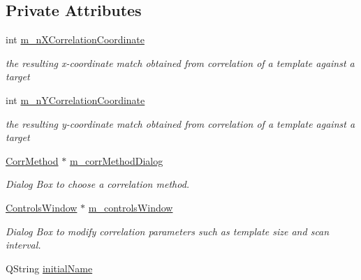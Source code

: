 \subsection*{Private Attributes}
\begin{DoxyCompactItemize}
\item 
\hypertarget{classQcorr_a53798525ce189307cf597e71aabca91b}{
int \hyperlink{classQcorr_a53798525ce189307cf597e71aabca91b}{m\_\-nXCorrelationCoordinate}}
\label{classQcorr_a53798525ce189307cf597e71aabca91b}

\begin{DoxyCompactList}\small\item\em the resulting x-\/coordinate match obtained from correlation of a template against a target \item\end{DoxyCompactList}\item 
\hypertarget{classQcorr_a29f34cc7b765d5a64856696c48bfc191}{
int \hyperlink{classQcorr_a29f34cc7b765d5a64856696c48bfc191}{m\_\-nYCorrelationCoordinate}}
\label{classQcorr_a29f34cc7b765d5a64856696c48bfc191}

\begin{DoxyCompactList}\small\item\em the resulting y-\/coordinate match obtained from correlation of a template against a target \item\end{DoxyCompactList}\item 
\hypertarget{classQcorr_a6509fcbf4cd8925aa109cc53e638b69a}{
\hyperlink{classCorrMethod}{CorrMethod} $\ast$ \hyperlink{classQcorr_a6509fcbf4cd8925aa109cc53e638b69a}{m\_\-corrMethodDialog}}
\label{classQcorr_a6509fcbf4cd8925aa109cc53e638b69a}

\begin{DoxyCompactList}\small\item\em Dialog Box to choose a correlation method. \item\end{DoxyCompactList}\item 
\hypertarget{classQcorr_a5b43654ac42b41b945cd58ce62b18ed0}{
\hyperlink{classControlsWindow}{ControlsWindow} $\ast$ \hyperlink{classQcorr_a5b43654ac42b41b945cd58ce62b18ed0}{m\_\-controlsWindow}}
\label{classQcorr_a5b43654ac42b41b945cd58ce62b18ed0}

\begin{DoxyCompactList}\small\item\em Dialog Box to modify correlation parameters such as template size and scan interval. \item\end{DoxyCompactList}\item 
\hypertarget{classQcorr_a3430716ddbe203f677095c163da87f86}{
QString \hyperlink{classQcorr_a3430716ddbe203f677095c163da87f86}{initialName}}
\label{classQcorr_a3430716ddbe203f677095c163da87f86}


\end{DoxyCompactItemize}
